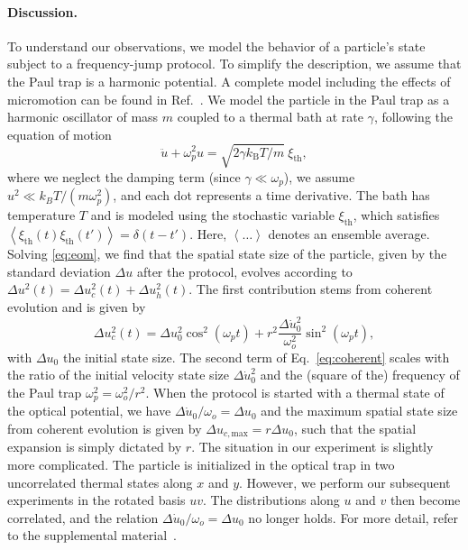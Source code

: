 \paragraph*{Discussion.}
To understand our observations, we model the behavior of a particle's state subject to a frequency-jump protocol. To simplify the description, we assume that the Paul trap is a harmonic potential. A complete model including the effects of micromotion can be found in Ref.~\cite{supplemental}.
%
We model the particle in the Paul trap as a harmonic oscillator of mass $m$ coupled to a thermal bath at rate $\gamma$, following the equation of motion
%
\begin{equation}
    \ddot{u} + \omega_p^2u = \sqrt{2\gamma k_\text{B} T/m}~\xi_\text{th},
    \label{eq:eom}
\end{equation}
where we neglect the damping term (since $\gamma\ll\omega_p$), we assume $u^2\ll{k_BT/(m\omega_p^2)}$, and each dot represents a time derivative. 
%
The bath has temperature $T$ and is modeled using the stochastic variable $\xi_\text{th}$, which satisfies $\left\langle\xi_\text{th}(t)\xi_\text{th}(t')\right\rangle = \delta(t-t')$. Here, $\left\langle\dots\right\rangle$ denotes an ensemble average. Solving \cref{eq:eom}, we find that the spatial state size of the particle, given by the standard deviation $\Delta u$ after the protocol, evolves according to $\Delta u^2(t) =\Delta u_c^2(t) + \Delta u_h^2(t)$. 
The first contribution stems from coherent evolution and is given by~\cite{graham1987squeezing}
\begin{equation}
    \Delta u_c^2(t) =
	\Delta u_0^2
    \cos^2 (\omega_p t) +
	r^2 \frac{
    \Delta \dot{u}_0^2
    }{\omega_o^2} \sin^2 (\omega_p t),
    \label{eq:coherent}
\end{equation}
with $\Delta u_0$ the initial state size. 
The second term of Eq.~\eqref{eq:coherent} scales with the ratio of the initial velocity state size $\Delta\dot u_0^2$ and the (square of the) frequency of the Paul trap $\omega_p^2=\omega_o^2/r^2$. When the protocol is started with a thermal state of the optical potential, we have $\Delta\dot u_0/\omega_o=\Delta u_0$ and the maximum spatial state size from coherent evolution is given by $\Delta u_{c,\text{max}}=r\Delta u_0$, such that the spatial expansion is simply dictated by $r$.
The situation in our experiment is slightly more complicated. The particle is initialized in the optical trap in two uncorrelated thermal states along $x$ and $y$. However, we perform our subsequent experiments in the rotated basis $uv$. The distributions along $u$ and $v$ then become correlated, and the relation $\Delta\dot u_0/\omega_o=\Delta u_0$ no longer holds. For more detail, refer to the supplemental material~\cite{supplemental}.

